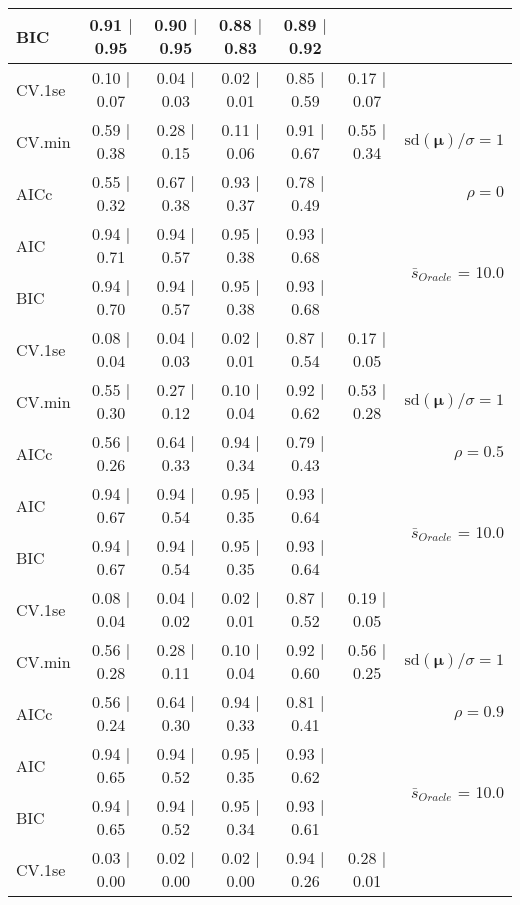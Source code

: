 \begin{table}
\begin{center}
\begin{tabular}{l*{5}{c}|r}
BIC & 0.91 $\mid$ 0.95 & 0.90 $\mid$ 0.95 & 0.88 $\mid$ 0.83 & 0.89 $\mid$ 0.92 & &  \\
 \hline 
CV.1se & 0.10 $\mid$ 0.07 & 0.04 $\mid$ 0.03 & 0.02 $\mid$ 0.01 & 0.85 $\mid$ 0.59 & 0.17 $\mid$ 0.07 & \\
CV.min & 0.59 $\mid$ 0.38 & 0.28 $\mid$ 0.15 & 0.11 $\mid$ 0.06 & 0.91 $\mid$ 0.67 & 0.55 $\mid$ 0.34 &  $\mathrm{sd}(\mathbf{\mu})/\sigma=1$ \\
AICc & 0.55 $\mid$ 0.32 & 0.67 $\mid$ 0.38 & 0.93 $\mid$ 0.37 & 0.78 $\mid$ 0.49 & & $\rho=0$ \\
AIC & 0.94 $\mid$ 0.71 & 0.94 $\mid$ 0.57 & 0.95 $\mid$ 0.38 & 0.93 $\mid$ 0.68 & &  \multirow{2}{*}{$\bar{s}_{Oracle}$ = 10.0} \\
BIC & 0.94 $\mid$ 0.70 & 0.94 $\mid$ 0.57 & 0.95 $\mid$ 0.38 & 0.93 $\mid$ 0.68 & &  \\
 \hline 
CV.1se & 0.08 $\mid$ 0.04 & 0.04 $\mid$ 0.03 & 0.02 $\mid$ 0.01 & 0.87 $\mid$ 0.54 & 0.17 $\mid$ 0.05 & \\
CV.min & 0.55 $\mid$ 0.30 & 0.27 $\mid$ 0.12 & 0.10 $\mid$ 0.04 & 0.92 $\mid$ 0.62 & 0.53 $\mid$ 0.28 &  $\mathrm{sd}(\mathbf{\mu})/\sigma=1$ \\
AICc & 0.56 $\mid$ 0.26 & 0.64 $\mid$ 0.33 & 0.94 $\mid$ 0.34 & 0.79 $\mid$ 0.43 & & $\rho=0.5$ \\
AIC & 0.94 $\mid$ 0.67 & 0.94 $\mid$ 0.54 & 0.95 $\mid$ 0.35 & 0.93 $\mid$ 0.64 & &  \multirow{2}{*}{$\bar{s}_{Oracle}$ = 10.0} \\
BIC & 0.94 $\mid$ 0.67 & 0.94 $\mid$ 0.54 & 0.95 $\mid$ 0.35 & 0.93 $\mid$ 0.64 & &  \\
 \hline 
CV.1se & 0.08 $\mid$ 0.04 & 0.04 $\mid$ 0.02 & 0.02 $\mid$ 0.01 & 0.87 $\mid$ 0.52 & 0.19 $\mid$ 0.05 & \\
CV.min & 0.56 $\mid$ 0.28 & 0.28 $\mid$ 0.11 & 0.10 $\mid$ 0.04 & 0.92 $\mid$ 0.60 & 0.56 $\mid$ 0.25 &  $\mathrm{sd}(\mathbf{\mu})/\sigma=1$ \\
AICc & 0.56 $\mid$ 0.24 & 0.64 $\mid$ 0.30 & 0.94 $\mid$ 0.33 & 0.81 $\mid$ 0.41 & & $\rho=0.9$ \\
AIC & 0.94 $\mid$ 0.65 & 0.94 $\mid$ 0.52 & 0.95 $\mid$ 0.35 & 0.93 $\mid$ 0.62 & &  \multirow{2}{*}{$\bar{s}_{Oracle}$ = 10.0} \\
BIC & 0.94 $\mid$ 0.65 & 0.94 $\mid$ 0.52 & 0.95 $\mid$ 0.34 & 0.93 $\mid$ 0.61 & &  \\
 \hline 
CV.1se & 0.03 $\mid$ 0.00 & 0.02 $\mid$ 0.00 & 0.02 $\mid$ 0.00 & 0.94 $\mid$ 0.26 & 0.28 $\mid$ 0.01 & \\

\end{tabular}
\end{center}
\end{table}
